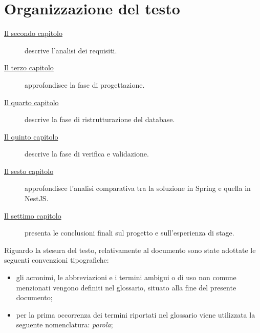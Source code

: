 \section{Organizzazione del testo}

\begin{description}
    \item[{\hyperref[cap:analisi-requisiti]{Il secondo capitolo}}] descrive l'analisi dei requisiti.
    
    \item[{\hyperref[cap:progettazione]{Il terzo capitolo}}] approfondisce la fase di progettazione.
    
    \item[{\hyperref[cap:ristrutturazione-database]{Il quarto capitolo}}] descrive la fase di ristrutturazione del database.
    
    \item[{\hyperref[cap:verifica-e-validazione]{Il quinto capitolo}}] descrive la fase di verifica e validazione.
    
    \item[{\hyperref[cap:analisi-comparativa]{Il sesto capitolo}}] approfondisce l'analisi comparativa tra la soluzione in Spring e quella in NestJS.
    
    \item[{\hyperref[cap:conclusioni]{Il settimo capitolo}}] presenta le conclusioni finali sul progetto e sull'esperienza di stage.
\end{description}

Riguardo la stesura del testo, relativamente al documento sono state adottate le seguenti convenzioni tipografiche:
\begin{itemize}
	\item gli acronimi, le abbreviazioni e i termini ambigui o di uso non comune menzionati vengono definiti nel glossario, situato alla fine del presente documento;
	\item per la prima occorrenza dei termini riportati nel glossario viene utilizzata la seguente nomenclatura: \emph{parola}\glsfirstoccur;
\end{itemize}